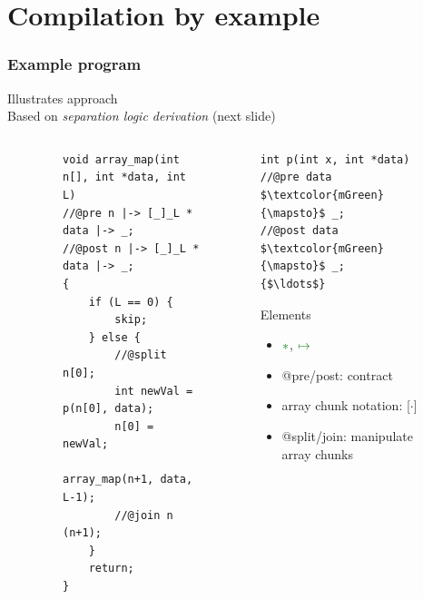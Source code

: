 \documentclass{beamer}
\begin{document}
\section{Compilation by example}

\begin{frame}[fragile]
\frametitle{Example program} %
Illustrates approach\\
Based on \emph{separation logic derivation} (next slide)
\begin{columns}
\begin{column}{0.015\textwidth}
\end{column}
\begin{column}{0.55\textwidth}
\begin{figure}[h]
  \centering
\begin{lstlisting}[style=CStyle, captionpos = t]
void array_map(int n[], int *data, int L)
//@pre n |-> [_]_L * data |-> _;
//@post n |-> [_]_L * data |-> _;
{
	if (L == 0) { 
		skip;
	} else {
		//@split n[0];
		int newVal = p(n[0], data);
		n[0] = newVal;
		array_map(n+1, data, L-1);
		//@join n (n+1);
	}
	return; 
}
\end{lstlisting}
\end{figure}
\end{column}
\begin{column}{0.43\textwidth}
\begin{lstlisting}[style=CStyle, captionpos = t]
int p(int x, int *data)
//@pre data $\textcolor{mGreen}{\mapsto}$ _; 
//@post data $\textcolor{mGreen}{\mapsto}$ _;
{$\ldots$}
\end{lstlisting}
\begin{block}{Elements}
\begin{itemize}
\item $\textcolor{mGreen}{\ast}$, $\textcolor{mGreen}{\mapsto}$ 
\item @pre/post: contract
\item array chunk notation: [$\cdot$]
\item @split/join: manipulate array chunks
\end{itemize}
\end{block}
\end{column}
\begin{column}{0.005\textwidth}
\end{column}
\end{columns}
\end{frame}
\end{document}
